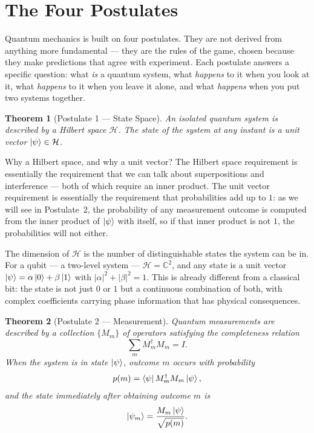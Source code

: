 \documentclass[12pt, a4paper, oneside]{report}
\theoremstyle{plain}
\newtheorem{theorem}{Theorem}[chapter]
\theoremstyle{definition}
\theoremstyle{remark}
\newcommand{\Hcal}{\mathcal{H}}
\newcommand{\CC}{\mathbb{C}}
\begin{document}
\section{The Four Postulates}

Quantum mechanics is built on four postulates. They are not derived from anything more
fundamental --- they are the rules of the game, chosen because they make predictions that
agree with experiment. Each postulate answers a specific question: what \emph{is} a quantum
system, what \emph{happens} to it when you look at it, what \emph{happens} to it when you
leave it alone, and what \emph{happens} when you put two systems together.

\begin{theorem}[Postulate 1 --- State Space]
	\label{post:state}
	An isolated quantum system is described by a Hilbert space $\Hcal$. The state of the system
	at any instant is a unit vector $\ket{\psi} \in \Hcal$.
\end{theorem}

Why a Hilbert space, and why a unit vector? The Hilbert space requirement is essentially the
requirement that we can talk about superpositions and interference --- both of which require
an inner product. The unit vector requirement is essentially the requirement that
probabilities add up to $1$: as we will see in Postulate~2, the probability of any
measurement outcome is computed from the inner product of $\ket{\psi}$ with itself, so if
that inner product is not $1$, the probabilities will not either.

The dimension of $\Hcal$ is the number of distinguishable states the system can be in. For
a qubit --- a two-level system --- $\Hcal = \CC^2$, and any state is a unit vector
$\ket{\psi} = \alpha\ket{0} + \beta\ket{1}$ with $|\alpha|^2 + |\beta|^2 = 1$. This is
already different from a classical bit: the state is not just $0$ or $1$ but a continuous
combination of both, with complex coefficients carrying phase information that has physical
consequences.

\begin{theorem}[Postulate 2 --- Measurement]
	\label{post:measurement}
	Quantum measurements are described by a collection $\{M_m\}$ of operators satisfying the
	completeness relation
	\[
		\sum_m M_m^\dagger M_m = I.
	\]
	When the system is in state $\ket{\psi}$, outcome $m$ occurs with probability
	\[
		p(m) = \bra{\psi}M_m^\dagger M_m\ket{\psi},
	\]
	and the state immediately after obtaining outcome $m$ is
	\[
		\ket{\psi_m} = \frac{M_m\ket{\psi}}{\sqrt{p(m)}}.
	\]
\end{theorem}
\end{document}
